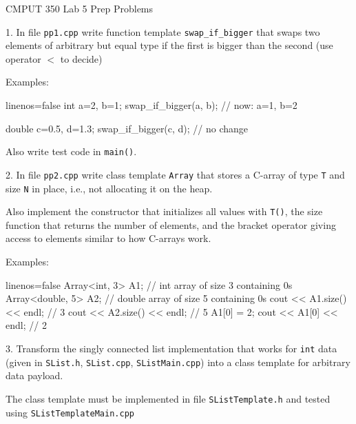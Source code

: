 \documentclass[a4paper,11pt]{article}
\begin{document}

\begin{center}
{\Large CMPUT 350 Lab 5 Prep Problems}
\end{center}


\linerule

1. In file \texttt{pp1.cpp} write function template \texttt{swap\_if\_bigger}
that swaps two elements of arbitrary but equal type if the first is bigger
than the second (use operator $<$ to decide)

\bigskip 
Examples:
\begin{cppcode*}{linenos=false}
int a=2, b=1;
swap_if_bigger(a, b);  // now: a=1, b=2

double c=0.5, d=1.3;
swap_if_bigger(c, d);  // no change
\end{cppcode*}

Also write test code in \texttt{main()}.



\linerule 

2. In file \texttt{pp2.cpp} write class template \texttt{Array} that
stores a C-array of type \texttt{T} and size \texttt{N} in place, i.e., not allocating it on the heap.

\bigskip 

Also implement the constructor that initializes all values with \texttt{T()}, the
size function that returns the number of elements, and the bracket operator
giving access to elements similar to how C-arrays work.

\bigskip 
Examples:
\begin{cppcode*}{linenos=false}
Array<int, 3> A1;               // int array of size 3 containing 0s
Array<double, 5> A2;            // double array of size 5 containing 0s
cout << A1.size() << endl;      // 3
cout << A2.size() << endl;      // 5
A1[0] = 2;
cout << A1[0] << endl;          // 2  
\end{cppcode*}



\linerule 

3. 
Transform the singly connected list implementation that works for \texttt{int} data
(given in \texttt{SList.h}, \texttt{SList.cpp}, \texttt{SListMain.cpp})
into a class template for arbitrary data payload. 

\bigskip 

The class template must be implemented in file \texttt{SListTemplate.h} and
tested using \texttt{SListTemplateMain.cpp}
\end{document}

